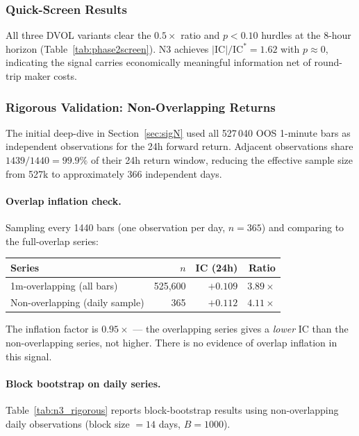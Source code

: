 \documentclass[12pt, a4paper]{article}
\theoremstyle{definition}
\newcommand{\IC}{\mathrm{IC}}
\begin{document}
\subsubsection{Quick-Screen Results}

All three DVOL variants clear the $0.5\times$ ratio and $p < 0.10$ hurdles
at the 8-hour horizon (Table~\ref{tab:phase2screen}).  N3 achieves
$|\IC|/\IC^* = 1.62$ with $p \approx 0$, indicating the signal carries
economically meaningful information net of round-trip maker costs.

\subsubsection{Rigorous Validation: Non-Overlapping Returns}
\label{sec:sigN_deepdive}

The initial deep-dive in Section~\ref{sec:sigN} used all 527\,040 OOS
1-minute bars as independent observations for the 24h forward return.
Adjacent observations share $1439/1440 = 99.9\%$ of their 24h return
window, reducing the effective sample size from 527k to approximately
366 independent days.

\paragraph{Overlap inflation check.}
Sampling every 1440 bars (one observation per day, $n = 365$) and comparing
to the full-overlap series:
\begin{center}
\begin{tabular}{lrrr}
\toprule
Series & $n$ & IC (24h) & Ratio \\
\midrule
1m-overlapping (all bars)      & 525,600 & $+0.109$ & $3.89\times$ \\
Non-overlapping (daily sample) &     365 & $+0.112$ & $4.11\times$ \\
\bottomrule
\end{tabular}
\end{center}
The inflation factor is $0.95\times$ --- the overlapping series gives a
\emph{lower} IC than the non-overlapping series, not higher.  There is no
evidence of overlap inflation in this signal.

\paragraph{Block bootstrap on daily series.}
Table~\ref{tab:n3_rigorous} reports block-bootstrap results using
non-overlapping daily observations (block size $= 14$ days, $B = 1000$).
\end{document}
